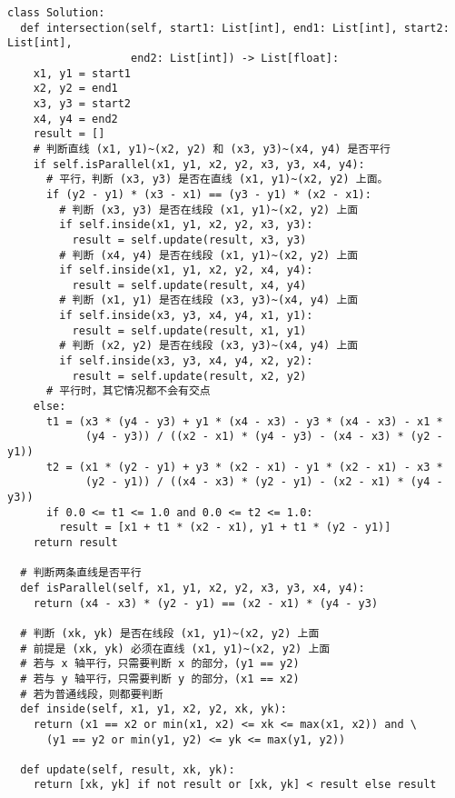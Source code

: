 \begin{verbatim}
class Solution:
  def intersection(self, start1: List[int], end1: List[int], start2: List[int],
                   end2: List[int]) -> List[float]:
    x1, y1 = start1
    x2, y2 = end1
    x3, y3 = start2
    x4, y4 = end2
    result = []
    # 判断直线 (x1, y1)~(x2, y2) 和 (x3, y3)~(x4, y4) 是否平行
    if self.isParallel(x1, y1, x2, y2, x3, y3, x4, y4):
      # 平行，判断 (x3, y3) 是否在直线 (x1, y1)~(x2, y2) 上面。
      if (y2 - y1) * (x3 - x1) == (y3 - y1) * (x2 - x1):
        # 判断 (x3, y3) 是否在线段 (x1, y1)~(x2, y2) 上面
        if self.inside(x1, y1, x2, y2, x3, y3):
          result = self.update(result, x3, y3)
        # 判断 (x4, y4) 是否在线段 (x1, y1)~(x2, y2) 上面
        if self.inside(x1, y1, x2, y2, x4, y4):
          result = self.update(result, x4, y4)
        # 判断 (x1, y1) 是否在线段 (x3, y3)~(x4, y4) 上面
        if self.inside(x3, y3, x4, y4, x1, y1):
          result = self.update(result, x1, y1)
        # 判断 (x2, y2) 是否在线段 (x3, y3)~(x4, y4) 上面
        if self.inside(x3, y3, x4, y4, x2, y2):
          result = self.update(result, x2, y2)
      # 平行时，其它情况都不会有交点
    else:
      t1 = (x3 * (y4 - y3) + y1 * (x4 - x3) - y3 * (x4 - x3) - x1 *
            (y4 - y3)) / ((x2 - x1) * (y4 - y3) - (x4 - x3) * (y2 - y1))
      t2 = (x1 * (y2 - y1) + y3 * (x2 - x1) - y1 * (x2 - x1) - x3 *
            (y2 - y1)) / ((x4 - x3) * (y2 - y1) - (x2 - x1) * (y4 - y3))
      if 0.0 <= t1 <= 1.0 and 0.0 <= t2 <= 1.0:
        result = [x1 + t1 * (x2 - x1), y1 + t1 * (y2 - y1)]
    return result

  # 判断两条直线是否平行
  def isParallel(self, x1, y1, x2, y2, x3, y3, x4, y4):
    return (x4 - x3) * (y2 - y1) == (x2 - x1) * (y4 - y3)

  # 判断 (xk, yk) 是否在线段 (x1, y1)~(x2, y2) 上面
  # 前提是 (xk, yk) 必须在直线 (x1, y1)~(x2, y2) 上面
  # 若与 x 轴平行，只需要判断 x 的部分，(y1 == y2)
  # 若与 y 轴平行，只需要判断 y 的部分，(x1 == x2)
  # 若为普通线段，则都要判断
  def inside(self, x1, y1, x2, y2, xk, yk):
    return (x1 == x2 or min(x1, x2) <= xk <= max(x1, x2)) and \
      (y1 == y2 or min(y1, y2) <= yk <= max(y1, y2))

  def update(self, result, xk, yk):
    return [xk, yk] if not result or [xk, yk] < result else result
\end{verbatim}

